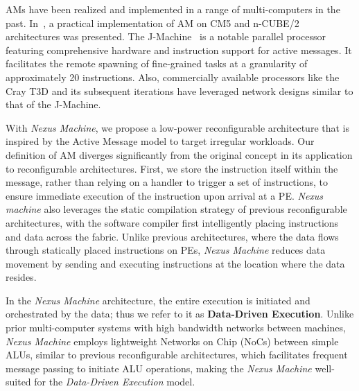 AMs have been realized and implemented in a range of multi-computers in the past. In~\cite{am_culler}, a practical implementation of AM on CM5 and n-CUBE/2 architectures was presented.
The J-Machine~\cite{jmachine} is a notable parallel processor featuring comprehensive hardware and instruction support for active messages.
It facilitates the remote spawning of fine-grained tasks at a granularity of approximately 20 instructions.
Also, commercially available processors like the Cray T3D and its subsequent iterations have leveraged network designs similar to that of the J-Machine.

With \textit{Nexus Machine}, we propose a low-power reconfigurable architecture that is inspired by the Active Message model to target irregular workloads. 
Our definition of AM diverges significantly from the original concept in its application to reconfigurable architectures. 
First, we store the instruction itself within the message, rather than relying on a handler to trigger a set of instructions, to ensure immediate execution of the instruction upon arrival at a PE. 
\textit{Nexus machine} also leverages the static compilation strategy of previous reconfigurable architectures, with the software compiler first intelligently placing instructions and data across the fabric.
Unlike previous architectures, where the data flows through statically placed instructions on PEs, \textit{Nexus Machine} reduces data movement by sending and executing instructions at the location where the data resides.

In the \textit{Nexus Machine} architecture, the entire execution is initiated and orchestrated by the data; thus we refer to it as \textbf{Data-Driven Execution}.
Unlike prior multi-computer systems with high bandwidth networks between machines, \textit{Nexus Machine} employs lightweight Networks on Chip (NoCs) between simple ALUs, similar to previous reconfigurable architectures, which facilitates frequent message passing to initiate ALU operations, making the \textit{Nexus Machine} well-suited for the \textit{Data-Driven Execution} model.

